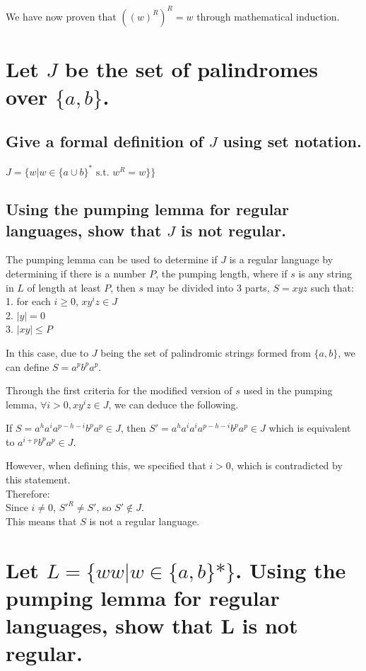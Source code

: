 \documentclass{article}
\begin{document}
We have now proven that $((w)^R)^R = w$ through mathematical induction.
\section{Let $J$ be the set of palindromes over $\{a,b\}$.}

\subsection{Give a formal definition of $J$ using set notation.}

$J = \{w | w \in \{a \cup b\}^* \text{ s.t. } w^R = w\}\}$

\subsection{Using the pumping lemma for regular languages, show that $J$ is not regular.}

The pumping lemma can be used to determine if $J$ is a regular language by determining if there is a number $P$, the pumping length, where if $s$ is any string in $L$ of length at least $P$, then $s$ may be divided into 3 parts, $S=xyz$ such that: \\
1. for each $i \ge 0$, $xy^iz \in J$ \\
2. $|y| = 0$ \\
3. $|xy| \le P$


In this case, due to $J$ being the set of palindromic strings formed from $\{a, b\}$, we can define $S = a^p b^p a^p$.


Through the first criteria for the modified version of $s$ used in the pumping lemma, $\forall i > 0, xy^iz \in J$, we can deduce the following. 

If $S = a^h a^i a^{p-h-i} b^p a^p \in J$, then $S' = a^h a^i a^i a^{p-h-i} b^p a^p \in J$ which is equivalent to $a^{i+p} b^p a^p \in J$.

However, when defining this, we specified that $i > 0$, which is contradicted by this statement. \\
Therefore: \\
Since $i \not = 0$, $S'^R \not = S'$, so $S' \not \in J$. \\
This means that $S$ is not a regular language.


\section{Let $L = \{ww | w \in \{a,b\}* \}$. Using the pumping lemma for regular languages, show that L is not regular.}
\end{document}
